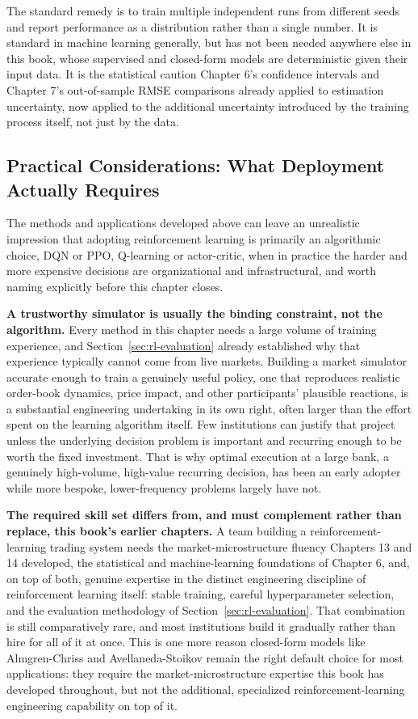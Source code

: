 \documentclass[../ai_in_finance]{subfiles}
\begin{document}
The standard remedy is to train multiple independent runs from different seeds and report performance as a distribution rather than a single number. It is standard in machine learning generally, but has not been needed anywhere else in this book, whose supervised and closed-form models are deterministic given their input data. It is the statistical caution Chapter 6's confidence intervals and Chapter 7's out-of-sample RMSE comparisons already applied to estimation uncertainty, now applied to the additional uncertainty introduced by the training process itself, not just by the data.

\subsection{Practical Considerations: What Deployment Actually Requires}
\label{sec:rl-practical}

The methods and applications developed above can leave an unrealistic impression that adopting reinforcement learning is primarily an algorithmic choice, DQN or PPO, Q-learning or actor-critic, when in practice the harder and more expensive decisions are organizational and infrastructural, and worth naming explicitly before this chapter closes.

\textbf{A trustworthy simulator is usually the binding constraint, not the algorithm.} Every method in this chapter needs a large volume of training experience, and Section~\ref{sec:rl-evaluation} already established why that experience typically cannot come from live markets. Building a market simulator accurate enough to train a genuinely useful policy, one that reproduces realistic order-book dynamics, price impact, and other participants' plausible reactions, is a substantial engineering undertaking in its own right, often larger than the effort spent on the learning algorithm itself. Few institutions can justify that project unless the underlying decision problem is important and recurring enough to be worth the fixed investment. That is why optimal execution at a large bank, a genuinely high-volume, high-value recurring decision, has been an early adopter while more bespoke, lower-frequency problems largely have not.

\textbf{The required skill set differs from, and must complement rather than replace, this book's earlier chapters.} A team building a reinforcement-learning trading system needs the market-microstructure fluency Chapters 13 and 14 developed, the statistical and machine-learning foundations of Chapter 6, and, on top of both, genuine expertise in the distinct engineering discipline of reinforcement learning itself: stable training, careful hyperparameter selection, and the evaluation methodology of Section~\ref{sec:rl-evaluation}. That combination is still comparatively rare, and most institutions build it gradually rather than hire for all of it at once. This is one more reason closed-form models like Almgren-Chriss and Avellaneda-Stoikov remain the right default choice for most applications: they require the market-microstructure expertise this book has developed throughout, but not the additional, specialized reinforcement-learning engineering capability on top of it.
\end{document}
